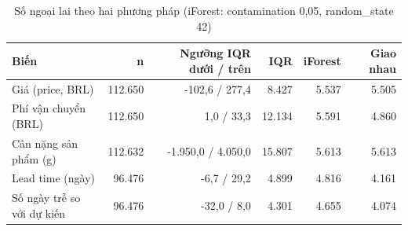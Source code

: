 \begin{table}[htbp]\centering\scriptsize\caption{Số ngoại lai theo hai phương pháp (iForest: contamination 0,05, random\_state 42)}\label{tab:outliers}
\begin{tabular}{p{4.2cm}rrrrr}\toprule
\textbf{Biến} & \textbf{n} & \textbf{Ngưỡng IQR dưới / trên} & \textbf{IQR} & \textbf{iForest} & \textbf{Giao nhau}\\\midrule
Giá (price, BRL) & 112.650 & -102,6 / 277,4 & 8.427 & 5.537 & 5.505\\
Phí vận chuyển (BRL) & 112.650 & 1,0 / 33,3 & 12.134 & 5.591 & 4.860\\
Cân nặng sản phẩm (g) & 112.632 & -1.950,0 / 4.050,0 & 15.807 & 5.613 & 5.613\\
Lead time (ngày) & 96.476 & -6,7 / 29,2 & 4.899 & 4.816 & 4.161\\
Số ngày trễ so với dự kiến & 96.476 & -32,0 / 8,0 & 4.301 & 4.655 & 4.074\\
\bottomrule\end{tabular}\end{table}
